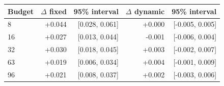\begin{center}
\begin{tabular}{lrrrr}
\toprule
Budget & $\Delta$ fixed & 95\% interval & $\Delta$ dynamic & 95\% interval\\
\midrule
8 & +0.044 & [0.028, 0.061] & +0.000 & [-0.005, 0.005]\\
16 & +0.027 & [0.013, 0.044] & -0.001 & [-0.006, 0.004]\\
32 & +0.030 & [0.018, 0.045] & +0.003 & [-0.002, 0.007]\\
63 & +0.019 & [0.006, 0.034] & +0.004 & [-0.001, 0.009]\\
96 & +0.021 & [0.008, 0.037] & +0.002 & [-0.003, 0.006]\\
\bottomrule
\end{tabular}
\end{center}
